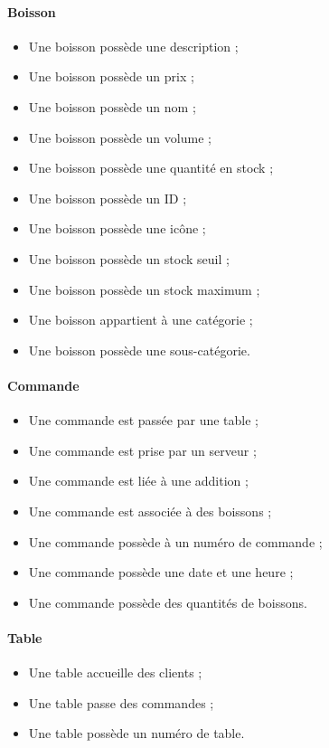 \paragraph{Boisson}
\begin{itemize}
	\item Une boisson possède une description ;
	\item Une boisson possède un prix ;
 	\item Une boisson possède un nom ;
	\item Une boisson possède un volume ;
	\item Une boisson possède une quantité en stock ;
	\item Une boisson possède un ID ;
	\item Une boisson possède une icône ;
	\item Une boisson possède un stock seuil ;
	\item Une boisson possède un stock maximum ;
	\item Une boisson appartient à une catégorie ;
	\item Une boisson possède une sous-catégorie.
\end{itemize}

\paragraph{Commande}
\begin{itemize}
	\item Une commande est passée par une table ;
	\item Une commande est prise par un serveur ;
	\item Une commande est liée à une addition ;
	\item Une commande est associée à des boissons ;
	\item Une commande possède à un numéro de commande ;
	\item Une commande possède une date et une heure ;
	\item Une commande possède des quantités de boissons.
\end{itemize}

\paragraph{Table}
\begin{itemize}
	\item Une table accueille des clients ;
	\item Une table passe des commandes ;
	\item Une table possède un numéro de table.
\end{itemize}

